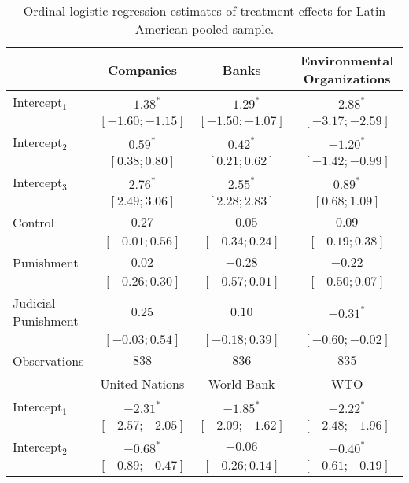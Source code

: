\begin{table}[h]
\begin{center}
\caption{Ordinal logistic regression estimates of treatment effects for Latin American pooled sample.}
\begin{threeparttable}
\begin{tabular}{l c c c}
\hline
 & Companies & Banks & Environmental
Organizations \\
\hline
Intercept$_1$       & $-1.38^{*}$       & $-1.29^{*}$       & $-2.88^{*}$       \\
                    & $ [-1.60; -1.15]$ & $ [-1.50; -1.07]$ & $ [-3.17; -2.59]$ \\
Intercept$_2$       & $0.59^{*}$        & $0.42^{*}$        & $-1.20^{*}$       \\
                    & $ [ 0.38;  0.80]$ & $ [ 0.21;  0.62]$ & $ [-1.42; -0.99]$ \\
Intercept$_3$       & $2.76^{*}$        & $2.55^{*}$        & $0.89^{*}$        \\
                    & $ [ 2.49;  3.06]$ & $ [ 2.28;  2.83]$ & $ [ 0.68;  1.09]$ \\
Control             & $0.27$            & $-0.05$           & $0.09$            \\
                    & $ [-0.01;  0.56]$ & $ [-0.34;  0.24]$ & $ [-0.19;  0.38]$ \\
Punishment          & $0.02$            & $-0.28$           & $-0.22$           \\
                    & $ [-0.26;  0.30]$ & $ [-0.57;  0.01]$ & $ [-0.50;  0.07]$ \\
Judicial Punishment & $0.25$            & $0.10$            & $-0.31^{*}$       \\
                    & $ [-0.03;  0.54]$ & $ [-0.18;  0.39]$ & $ [-0.60; -0.02]$ \\
\hline
Observations        & $838$             & $836$             & $835$             \\
\hline
 & United Nations & World Bank & WTO \\
\hline
Intercept$_1$       & $-2.31^{*}$       & $-1.85^{*}$       & $-2.22^{*}$       \\
                    & $ [-2.57; -2.05]$ & $ [-2.09; -1.62]$ & $ [-2.48; -1.96]$ \\
Intercept$_2$       & $-0.68^{*}$       & $-0.06$           & $-0.40^{*}$       \\
                    & $ [-0.89; -0.47]$ & $ [-0.26;  0.14]$ & $ [-0.61; -0.19]$ \\

\end{tabular}
\end{threeparttable}
\end{center}
\end{table}
